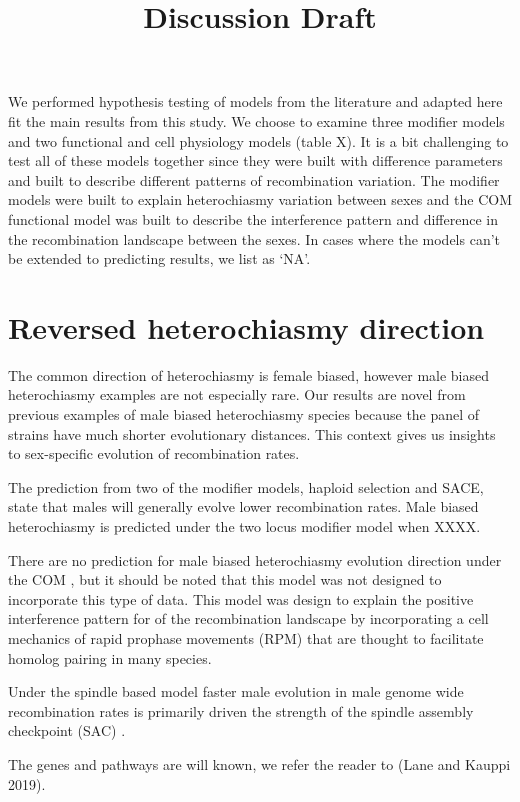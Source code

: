 \documentclass[]{article}
\title{Discussion Draft}
\author{}
\date{}
\begin{document}
\maketitle

We performed hypothesis testing of models from the literature and
adapted here fit the main results from this study. We choose to examine
three modifier models and two functional and cell physiology models
(table X). It is a bit challenging to test all of these models together
since they were built with difference parameters and built to describe
different patterns of recombination variation. The modifier models were
built to explain heterochiasmy variation between sexes and the COM
functional model was built to describe the interference pattern and
difference in the recombination landscape between the sexes. In cases
where the models can't be extended to predicting results, we list as
`NA'.

\section{Reversed heterochiasmy
direction}\label{reversed-heterochiasmy-direction}

The common direction of heterochiasmy is female biased, however male
biased heterochiasmy examples are not especially rare. Our results are
novel from previous examples of male biased heterochiasmy species
because the panel of strains have much shorter evolutionary distances.
This context gives us insights to sex-specific evolution of
recombination rates.

The prediction from two of the modifier models, haploid selection and
SACE, state that males will generally evolve lower recombination rates.
Male biased heterochiasmy is predicted under the two locus modifier
model when XXXX.

There are no prediction for male biased heterochiasmy evolution
direction under the COM , but it should be noted that this model was not
designed to incorporate this type of data. This model was design to
explain the positive interference pattern for of the recombination
landscape by incorporating a cell mechanics of rapid prophase movements
(RPM) that are thought to facilitate homolog pairing in many species.

Under the spindle based model faster male evolution in male genome wide
recombination rates is primarily driven the strength of the spindle
assembly checkpoint (SAC) .

The genes and pathways are will known, we refer the reader to (Lane and
Kauppi 2019).
\end{document}
